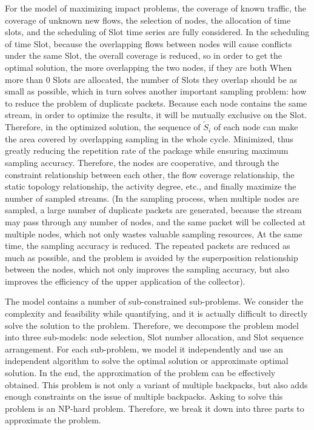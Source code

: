 \documentclass[conference,compsoc]{IEEEtran}
\begin{document}
 

For the model of maximizing impact problems, the coverage of known traffic, the coverage of unknown new flows, the selection of nodes, the allocation of time slots, and the scheduling of Slot time series are fully considered. In the scheduling of time Slot, because the overlapping flows between nodes will cause conflicts under the same Slot, the overall coverage is reduced, so in order to get the optimal solution, the more overlapping the two nodes, if they are both When more than 0 Slots are allocated, the number of Slots they overlap should be as small as possible, which in turn solves another important sampling problem: how to reduce the problem of duplicate packets. Because each node contains the same stream, in order to optimize the results, it will be mutually exclusive on the Slot. Therefore, in the optimized solution, the sequence of $\widetilde S_i$ of each node can make the area covered by overlapping sampling in the whole cycle. Minimized, thus greatly reducing the repetition rate of the package while ensuring maximum sampling accuracy. Therefore, the nodes are cooperative, and through the constraint relationship between each other, the flow coverage relationship, the static topology relationship, the activity degree, etc., and finally maximize the number of sampled streams. (In the sampling process, when multiple nodes are sampled, a large number of duplicate packets are generated, because the stream may pass through any number of nodes, and the same packet will be collected at multiple nodes, which not only wastes valuable sampling resources, At the same time, the sampling accuracy is reduced. The repeated packets are reduced as much as possible, and the problem is avoided by the superposition relationship between the nodes, which not only improves the sampling accuracy, but also improves the efficiency of the upper application of the collector).

The model contains a number of sub-constrained sub-problems. We consider the complexity and feasibility while quantifying, and it is actually difficult to directly solve the solution to the problem. Therefore, we decompose the problem model into three sub-models: node selection, Slot number allocation, and Slot sequence arrangement. For each sub-problem, we model it independently and use an independent algorithm to solve the optimal solution or approximate optimal solution. In the end, the approximation of the problem can be effectively obtained.
This problem is not only a variant of multiple backpacks, but also adds enough constraints on the issue of multiple backpacks. Asking to solve this problem is an NP-hard problem. Therefore, we break it down into three parts to approximate the problem.
\end{document}
